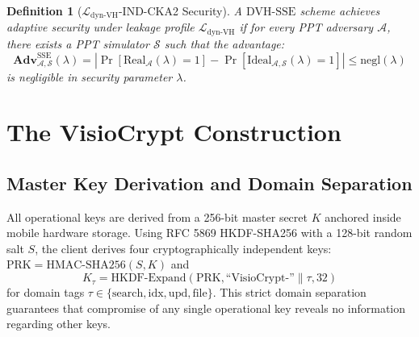 \documentclass[10pt,conference]{IEEEtran}
\newenvironment{revised}{\color{revcolor}}{}
\newtheorem{definition}{Definition}
\begin{document}
\begin{revised}
\begin{definition}[$\mathcal{L}_{\text{dyn-VH}}$-IND-CKA2 Security]
A $\text{DVH-SSE}$ scheme achieves adaptive security under leakage profile $\mathcal{L}_{\text{dyn-VH}}$ if for every PPT adversary $\mathcal{A}$, there exists a PPT simulator $\mathcal{S}$ such that the advantage:
\begin{equation}
\mathbf{Adv}_{\mathcal{A},\mathcal{S}}^{\text{SSE}}(\lambda) = \left| \Pr[\text{Real}_{\mathcal{A}}(\lambda) = 1] - \Pr[\text{Ideal}_{\mathcal{A},\mathcal{S}}(\lambda) = 1] \right| \le \text{negl}(\lambda)
\end{equation}
is negligible in security parameter $\lambda$.
\end{definition}

\section{The VisioCrypt Construction}
\subsection{Master Key Derivation and Domain Separation}
All operational keys are derived from a 256-bit master secret $K$ anchored inside mobile hardware storage. Using RFC 5869 HKDF-SHA256 with a 128-bit random salt $S$, the client derives four cryptographically independent keys: $\text{PRK} = \text{HMAC-SHA256}(S, K)$ and
\begin{equation}
K_{\tau} = \text{HKDF-Expand}(\text{PRK}, \text{``VisioCrypt-''}\parallel \tau, 32)
\end{equation}
for domain tags $\tau \in \{\text{search}, \text{idx}, \text{upd}, \text{file}\}$. This strict domain separation guarantees that compromise of any single operational key reveals no information regarding other keys.


\end{revised}
\end{document}
